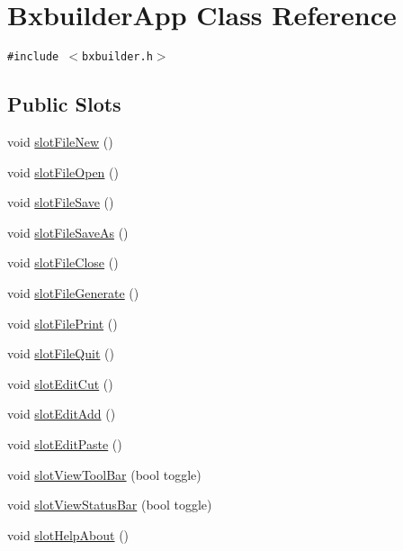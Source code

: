 \hypertarget{class_bxbuilder_app}{
\section{BxbuilderApp Class Reference}
\label{class_bxbuilder_app}
}
{\tt \#include $<$bxbuilder.h$>$}

\subsection*{Public Slots}
\begin{CompactItemize}
\item 
void \hyperlink{class_bxbuilder_app_0f2e6b7987ce423edbe0a260233353d3}{slotFileNew} ()
\item 
void \hyperlink{class_bxbuilder_app_71cdb85b5c6a99f6d2f6a6bd98811f20}{slotFileOpen} ()
\item 
void \hyperlink{class_bxbuilder_app_d2d53328b5dabade1838100fc88b5fc4}{slotFileSave} ()
\item 
void \hyperlink{class_bxbuilder_app_be410f53109bba66ced967a73e64008c}{slotFileSaveAs} ()
\item 
void \hyperlink{class_bxbuilder_app_1a024140268e7d0346f28cc3c569f3ca}{slotFileClose} ()
\item 
void \hyperlink{class_bxbuilder_app_2c67ccee0bb45d54f27d059fd9136d64}{slotFileGenerate} ()
\item 
void \hyperlink{class_bxbuilder_app_be699f4ab7dbd23a948ba68bd9610c12}{slotFilePrint} ()
\item 
void \hyperlink{class_bxbuilder_app_24c154ae07ff22499c8aee9668e377cb}{slotFileQuit} ()
\item 
void \hyperlink{class_bxbuilder_app_cbc7ffdff53872039965f218541ad47a}{slotEditCut} ()
\item 
void \hyperlink{class_bxbuilder_app_ad899f797245ea9ad0763fcdd2a5d142}{slotEditAdd} ()
\item 
void \hyperlink{class_bxbuilder_app_77bb016165058a8b1b40d0379c0d257a}{slotEditPaste} ()
\item 
void \hyperlink{class_bxbuilder_app_6461fe165888a2c116c9b2bd7c1240d7}{slotViewToolBar} (bool toggle)
\item 
void \hyperlink{class_bxbuilder_app_1334d5fff728f7985952f30001c33913}{slotViewStatusBar} (bool toggle)
\item 
void \hyperlink{class_bxbuilder_app_09e4301881ff984163cce5202603e486}{slotHelpAbout} ()
\end{CompactItemize}
